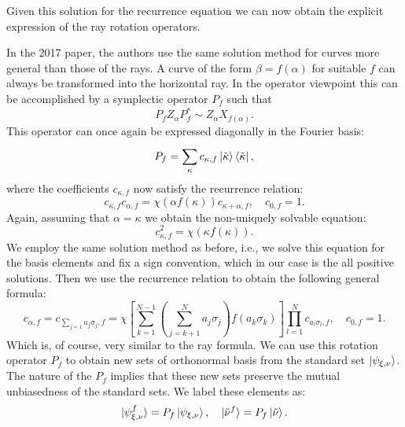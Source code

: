 \documentclass[a4paper]{article}
\begin{document}
  Given this solution for the recurrence equation we can now
  obtain the explicit expression of the ray rotation
  operators.

  In the 2017 paper, the authors use the same solution
  method for curves more general than those of the rays.  A
  curve of the form $\beta = f(\alpha)$ for suitable $f$ can
  always be transformed into the horizontal ray. In the
  operator viewpoint this can be accomplished by a
  symplectic operator $P_f$ such that
  \begin{equation}
    P_f Z_\alpha P_f^* \sim Z_\alpha X_{f(\alpha)}.
  \end{equation}
  This operator can once again be expressed diagonally in
  the Fourier basis:
  \begin{equation}
    P_f = \sum_{\kappa}^{} c_{\kappa,f}
    \ket{\tilde\kappa}\bra{\tilde\kappa},
  \end{equation}
  where the coefficients $c_{\kappa,f}$ now satisfy the
  recurrence relation:
  \begin{equation}
    c_{\kappa,f} c_{\alpha,f}
    = \chi(\alpha f(\kappa)) c_{\kappa+\alpha,f},
    \quad c_{0,f} = 1.
  \end{equation}
  Again, assuming that $\alpha = \kappa$ we obtain the
  non-uniquely solvable equation:
  \begin{equation}
    c_{\kappa,f}^2 = \chi(\kappa f(\kappa)).
  \end{equation}
  We employ the same solution method as before, i.e., we
  solve this equation for the basis elements and fix a sign
  convention, which in our case is the all positive
  solutions. Then we use the recurrence relation to obtain
  the following general formula:
  \begin{equation}
    c_{\alpha,f}
    = c_{\sum_{j=1} a_j \sigma_j, f}
    = \chi\left[
    \sum_{k=1}^{N-1} \left(\sum_{j=k+1}^N a_j
    \sigma_j\right) f(a_k \sigma_k) \right] \prod_{l=1}^N
    c_{a_l \sigma_l, f}  , \quad c_{0,f} = 1.
  \end{equation}
  Which is, of course, very similar to the ray formula. We
  can use this rotation operator $P_f$ to obtain new sets of
  orthonormal basis from the standard set
  $\ket{\psi_{\xi,\nu}}$. The nature of the $P_f$ implies
  that these new sets preserve the mutual unbiasedness of
  the standard sets. We label these elements as:
  \begin{equation}
    \ket{\psi_{\xi,\nu}^f}
    = P_f \ket{\psi_{\xi,\nu}},
    \quad
    \ket{\tilde\nu^f}
    = P_f \ket{\tilde\nu}.
  \end{equation}
\end{document}
